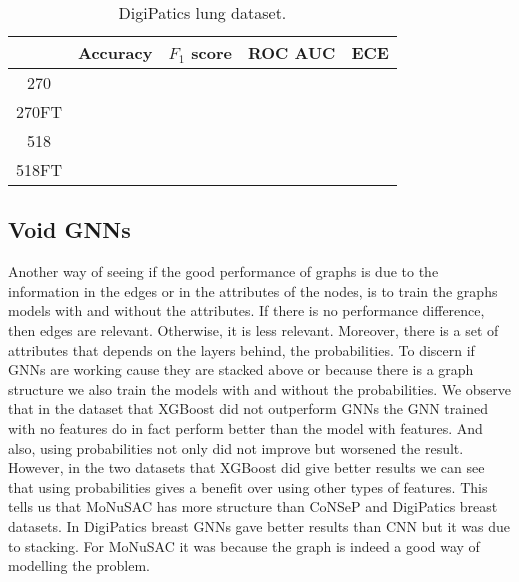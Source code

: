 \begin{table}[ht]
\vspace{0.5cm}

\begin{tabular}{c|c|c|c|c|}
  \cline{2-5}
  & Accuracy & $F_1$ score & ROC AUC & ECE \\ \hline
\multicolumn{1}{|c|}{270}  &  &  &  &  \\ \hline
\multicolumn{1}{|c|}{270FT}  &  &  &  &  \\ \hline
\multicolumn{1}{|c|}{518}  &  &  &  &  \\ \hline
\multicolumn{1}{|c|}{518FT}  &  &  &  &  \\ \hline
\end{tabular}
\caption{DigiPatics lung dataset.}
    \label{tab:scaling}
\end{table}

\newpage
\subsection{Void GNNs}

Another way of seeing if the good performance of graphs is due to the information in the edges or in the attributes of the nodes, is to train the graphs models with and without the attributes. If there is no performance difference, then edges are relevant. Otherwise, it is less relevant. Moreover, there is a set of attributes that depends on the layers behind, the probabilities. To discern if GNNs are working cause they are stacked above or because there is a graph structure we also train the models with and without the probabilities. We observe that in the dataset that XGBoost did not outperform GNNs the GNN trained with no features do in fact perform better than the model with features. And also, using probabilities not only did not improve but worsened the result. However, in the two datasets that XGBoost did give better results we can see that using probabilities gives a benefit over using other types of features. This tells us that MoNuSAC has more structure than CoNSeP and DigiPatics breast datasets. In DigiPatics breast GNNs gave better results than CNN but it was due to stacking. For MoNuSAC it was because the graph is indeed a good way of modelling the problem. 

